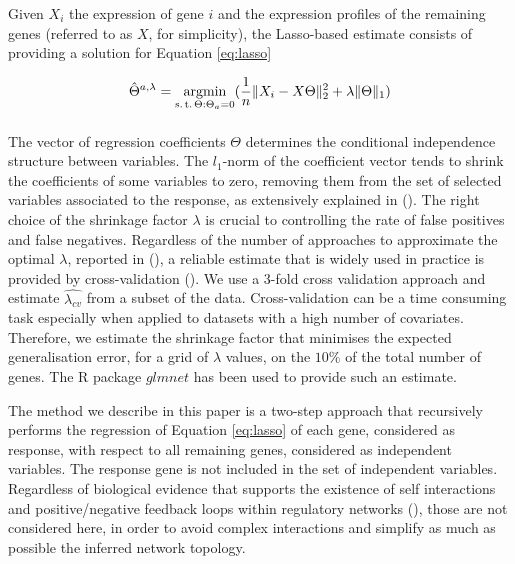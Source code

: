 Given $X_i$ the expression of gene $i$ and the expression profiles of the remaining genes  (referred to as $X$, for simplicity), the Lasso-based estimate consists of providing a solution for Equation \ref{eq:lasso}
  
\begin{equation}
\label{eq:lasso}
    \hat{\Theta}^{a,\lambda} = 
    \argmin_{%
      \substack{%
        \text{s.\,t.}\, \Theta:\Theta_a = 0 \\
        \phantom{}\, 
      }
    }
    (\frac{1}{n} \| X_i - X\Theta \|^{2}_2 + \lambda \| \Theta \|_1)
  \end{equation}
  
The vector of regression coefficients $\Theta$ determines the conditional independence structure between variables. The $l_1$-norm of the coefficient vector tends to shrink the coefficients of some variables to zero, removing them from the set of selected variables associated to the response, as extensively explained in (\citealp{Tibshirani94regressionshrinkage}). 
The right choice of the shrinkage factor $\lambda$ is crucial to controlling the rate of false positives and false negatives. Regardless of the number of approaches to approximate the optimal $\lambda$, reported in (\citealp{adalasso, efron2004, tuneparamsel}), a reliable estimate that is widely used in practice is provided by cross-validation (\citealp{glmnet}). 
We use a 3-fold cross validation approach and estimate $\hat{\lambda_{cv}}$ from a subset of the data. Cross-validation can be a time consuming task especially when applied to datasets with a high number of covariates. Therefore, we estimate the shrinkage factor that minimises the expected generalisation error, for a grid of $\lambda$ values, on the $10\%$ of the total number of genes. The R package $glmnet$ has been used to provide such an estimate.  

The method we describe in this paper is a two-step approach that recursively performs the regression of Equation \ref{eq:lasso} of each gene, considered as response, with respect to all remaining genes, considered as independent variables. The response gene is not included in the set of independent variables. Regardless of biological evidence that supports the existence of self interactions and positive/negative feedback loops within regulatory networks (\citealp{netmotif, avrahamfeedback2011, generegmodel}), those are not considered here, in order to avoid complex interactions and simplify as much as possible the inferred network topology.

